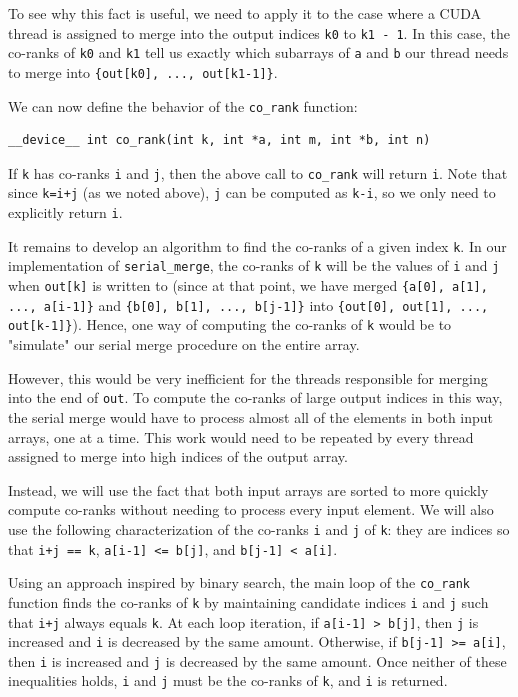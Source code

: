 \documentclass{article}
\theoremstyle{definition}
\begin{document}
To see why this fact is useful, we need to apply it to the case where a CUDA thread is assigned to merge into the output indices \texttt{k0} to \texttt{k1 - 1}. In this case, the co-ranks of \texttt{k0} and \texttt{k1} tell us exactly which subarrays of \texttt{a} and \texttt{b} our thread needs to merge into \texttt{\{out[k0], ..., out[k1-1]\}}.

We can now define the behavior of the \texttt{co\_rank} function:

\begin{verbatim}
__device__ int co_rank(int k, int *a, int m, int *b, int n)
\end{verbatim}

If \texttt{k} has co-ranks \texttt{i} and \texttt{j}, then the above call to \texttt{co\_rank} will return \texttt{i}. Note that since \texttt{k=i+j} (as we noted above), \texttt{j} can be computed as \texttt{k-i}, so we only need to explicitly return \texttt{i}.

It remains to develop an algorithm to find the co-ranks of a given index \texttt{k}. In our implementation of \texttt{serial\_merge}, the co-ranks of \texttt{k} will be the values of \texttt{i} and \texttt{j} when \texttt{out[k]} is written to (since at that point, we have merged 
\texttt{\{a[0], a[1], ..., a[i-1]\}} and \texttt{\{b[0], b[1], ..., b[j-1]\}} into \texttt{\{out[0], out[1], ..., out[k-1]\}}). Hence, one way of computing the co-ranks of \texttt{k} would be to "simulate" our serial merge procedure on the entire array.

However, this would be very inefficient for the threads responsible for merging into the end of \texttt{out}. To compute the co-ranks of large output indices in this way, the serial merge would have to process almost all of the elements in both input arrays, one at a time. This work would need to be repeated by every thread assigned to merge into high indices of the output array.

Instead, we will use the fact that both input arrays are sorted to more quickly compute co-ranks without needing to process every input element. We will also use the following characterization of the co-ranks \texttt{i} and \texttt{j} of \texttt{k}: they are indices so that \texttt{i+j == k}, \texttt{a[i-1] <= b[j]}, and \texttt{b[j-1] < a[i]}. 

Using an approach inspired by binary search, the main loop of the \texttt{co\_rank} function finds the co-ranks of \texttt{k} by maintaining candidate indices \texttt{i} and \texttt{j} such that \texttt{i+j} always equals \texttt{k}. At each loop iteration, if \texttt{a[i-1] > b[j]}, then \texttt{j} is increased and \texttt{i} is decreased by the same amount. Otherwise, if \texttt{b[j-1] >= a[i]}, then \texttt{i} is increased and \texttt{j} is decreased by the same amount. Once neither of these inequalities holds, \texttt{i} and \texttt{j} must be the co-ranks of \texttt{k}, and \texttt{i} is returned.
\end{document}
